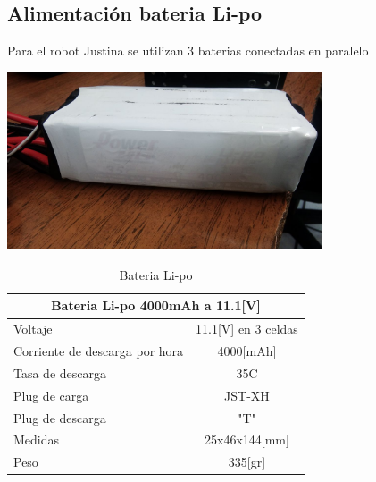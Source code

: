 \documentclass[a4paper]{book}
\begin{document}
\subsection{Alimentación bateria Li-po}

Para el robot Justina se utilizan 3 baterias conectadas en paralelo

\begin{center}
\includegraphics[width=0.7\textwidth]{Figures/Hardware/Partes/Li-po_Battery.jpg}
\label{fig:Hardware:Partes:Battery}
\end{center}

\begin{table}[H]
\begin{center}
\begin{tabular}{|l|l|}%

\hline
\multicolumn{2}{|c|}{Bateria Li-po 4000mAh a 11.1[V]} \\ \hline %
Voltaje &  \multicolumn{1}{|c|}{11.1[V] en 3 celdas}\\ \hline
Corriente de descarga por hora  & \multicolumn{1}{|c|}{4000[mAh]}\\ \hline
Tasa de descarga & \multicolumn{1}{|c|}{35C}\\ \hline
Plug de carga & \multicolumn{1}{|c|}{JST-XH}\\ \hline
Plug de descarga & \multicolumn{1}{|c|}{"T"}\\ \hline
Medidas & \multicolumn{1}{|c|}{25x46x144[mm]}\\ \hline
Peso & \multicolumn{1}{|c|}{335[gr]}\\ \hline

\end{tabular}
\caption{Bateria Li-po}
\label{Battery}
\end{center}
\end{table}
\end{document}
